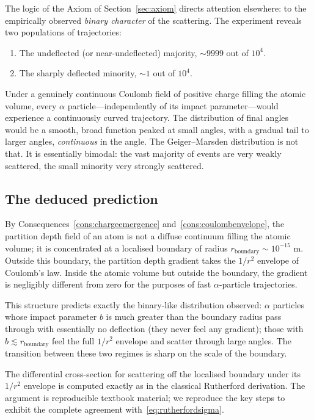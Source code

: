 \documentclass[11pt,twocolumn,a4paper]{article}
\theoremstyle{axiomstyle}
\theoremstyle{conseqstyle}
\theoremstyle{definition}
\theoremstyle{remark}
\begin{document}
The logic of the Axiom of Section~\ref{sec:axiom} directs attention elsewhere: to the empirically observed \emph{binary character} of the scattering. The experiment reveals two populations of trajectories:
\begin{enumerate}[label=(\alph*)]
\item The undeflected (or near-undeflected) majority, $\sim 9999$ out of $10^{4}$.
\item The sharply deflected minority, $\sim 1$ out of $10^{4}$.
\end{enumerate}
Under a genuinely continuous Coulomb field of positive charge filling the atomic volume, every $\alpha$ particle---independently of its impact parameter---would experience a continuously curved trajectory. The distribution of final angles would be a smooth, broad function peaked at small angles, with a gradual tail to larger angles, \emph{continuous} in the angle. The Geiger--Marsden distribution is not that. It is essentially bimodal: the vast majority of events are very weakly scattered, the small minority very strongly scattered.

\subsection{The deduced prediction}

By Consequences~\ref{cons:chargeemergence} and~\ref{cons:coulombenvelope}, the partition depth field of an atom is not a diffuse continuum filling the atomic volume; it is concentrated at a localised boundary of radius $r_{\text{boundary}}\sim 10^{-15}$ m. Outside this boundary, the partition depth gradient takes the $1/r^{2}$ envelope of Coulomb's law. Inside the atomic volume but outside the boundary, the gradient is negligibly different from zero for the purposes of fast $\alpha$-particle trajectories.

This structure predicts exactly the binary-like distribution observed: $\alpha$ particles whose impact parameter $b$ is much greater than the boundary radius pass through with essentially no deflection (they never feel any gradient); those with $b\lesssim r_{\text{boundary}}$ feel the full $1/r^{2}$ envelope and scatter through large angles. The transition between these two regimes is sharp on the scale of the boundary.

The differential cross-section for scattering off the localised boundary under its $1/r^{2}$ envelope is computed exactly as in the classical Rutherford derivation. The argument is reproducible textbook material; we reproduce the key steps to exhibit the complete agreement with~\eqref{eq:rutherfordsigma}.
\end{document}
